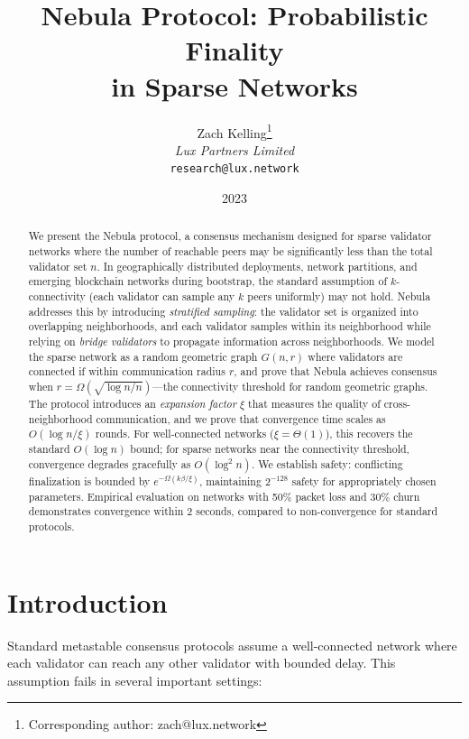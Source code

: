 \documentclass[11pt,a4paper]{article}
\title{\textbf{Nebula Protocol: Probabilistic Finality\\in Sparse Networks}}
\author{
Zach Kelling\thanks{Corresponding author: zach@lux.network}\\
\textit{Lux Partners Limited}\\
\texttt{research@lux.network}
}
\date{2023}
\begin{document}
\luxcoverpage
\maketitle

\begin{abstract}
We present the Nebula protocol, a consensus mechanism designed for sparse validator
networks where the number of reachable peers may be significantly less than the total
validator set $n$. In geographically distributed deployments, network partitions, and
emerging blockchain networks during bootstrap, the standard assumption of $k$-connectivity
(each validator can sample any $k$ peers uniformly) may not hold. Nebula addresses this
by introducing \emph{stratified sampling}: the validator set is organized into overlapping
neighborhoods, and each validator samples within its neighborhood while relying on
\emph{bridge validators} to propagate information across neighborhoods.
We model the sparse network as a random geometric graph $G(n, r)$ where validators
are connected if within communication radius $r$, and prove that Nebula achieves
consensus when $r = \Omega(\sqrt{\log n / n})$---the connectivity threshold for random
geometric graphs. The protocol introduces an \emph{expansion factor} $\xi$ that
measures the quality of cross-neighborhood communication, and we prove that convergence
time scales as $O(\log n / \xi)$ rounds. For well-connected networks ($\xi = \Theta(1)$),
this recovers the standard $O(\log n)$ bound; for sparse networks near the connectivity
threshold, convergence degrades gracefully as $O(\log^2 n)$.
We establish safety: conflicting finalization is bounded by $e^{-\Omega(k\beta/\xi)}$,
maintaining $2^{-128}$ safety for appropriately chosen parameters.
Empirical evaluation on networks with 50\% packet loss and 30\% churn demonstrates
convergence within 2 seconds, compared to non-convergence for standard protocols.
\end{abstract}

\tableofcontents
\newpage

\section{Introduction}
\label{sec:introduction}

Standard metastable consensus protocols assume a well-connected network where each
validator can reach any other validator with bounded delay. This assumption fails in
several important settings:
\end{document}
